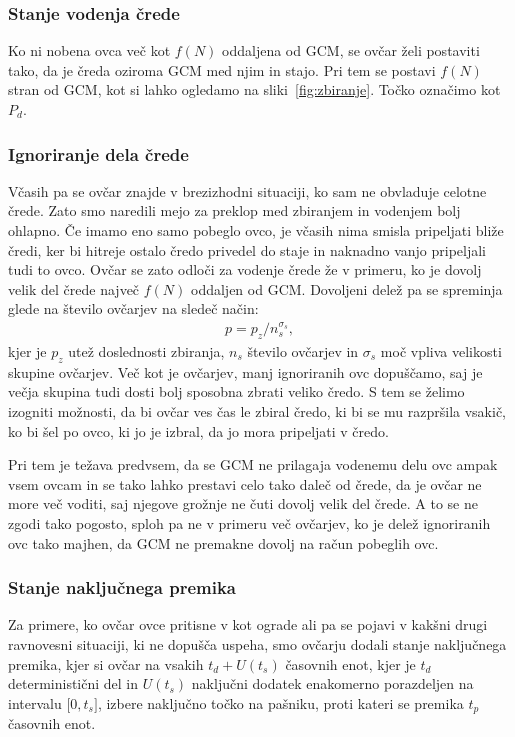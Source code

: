 \subsubsection{Stanje vodenja črede}

Ko ni nobena ovca več kot $f(N)$ oddaljena od GCM, se ovčar želi postaviti tako, da je čreda oziroma GCM med njim in stajo. Pri tem se postavi $f(N)$ stran od GCM, kot si lahko ogledamo na sliki~\ref{fig:zbiranje}. Točko označimo kot $P_d$.

\subsubsection{Ignoriranje dela črede}

Včasih pa se ovčar znajde v brezizhodni situaciji, ko sam ne obvladuje celotne črede. Zato smo naredili mejo za preklop med zbiranjem in vodenjem bolj ohlapno. Če imamo eno samo pobeglo ovco, je včasih nima smisla pripeljati bliže čredi, ker bi hitreje ostalo čredo privedel do staje in naknadno vanjo pripeljali tudi to ovco. Ovčar se zato odloči za vodenje črede že v primeru, ko je dovolj velik del črede največ $f(N)$ oddaljen od GCM. Dovoljeni delež pa se spreminja glede na število ovčarjev na sledeč način:
\begin{align}
p = p_z / n_s^{\sigma_s}, \label{eq:ignoriranje}
\end{align}
kjer je $p_z$ utež doslednosti zbiranja, $n_s$ število ovčarjev in $\sigma_s$ moč vpliva velikosti skupine ovčarjev. Več kot je ovčarjev, manj ignoriranih ovc dopuščamo, saj je večja skupina tudi dosti bolj sposobna zbrati veliko čredo. S tem se želimo izogniti možnosti, da bi ovčar ves čas le zbiral čredo, ki bi se mu razpršila vsakič, ko bi šel po ovco, ki jo je izbral, da jo mora pripeljati v čredo.

Pri tem je težava predvsem, da se GCM ne prilagaja vodenemu delu ovc ampak vsem ovcam in se tako lahko prestavi celo tako daleč od črede, da je ovčar ne more več voditi, saj njegove grožnje ne čuti dovolj velik del črede. A to se ne zgodi tako pogosto, sploh pa ne v primeru več ovčarjev, ko je delež ignoriranih ovc tako majhen, da GCM ne premakne dovolj na račun pobeglih ovc.

\subsubsection{Stanje naključnega premika}

Za primere, ko ovčar ovce pritisne v kot ograde ali pa se pojavi v kakšni drugi ravnovesni situaciji, ki ne dopušča uspeha, smo ovčarju dodali stanje naključnega premika, kjer si ovčar na vsakih $t_d + U(t_s)$ časovnih enot, kjer je $t_d$ deterministični del in $U(t_s)$ naključni dodatek enakomerno porazdeljen na intervalu $\lbrack 0, t_s\rbrack$, izbere naključno točko na pašniku, proti kateri se premika $t_p$ časovnih enot.

